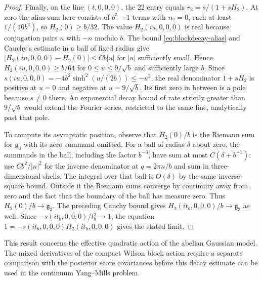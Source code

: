 \begin{proof}
Finally, on the line $(t,0,0,0)$, the $22$ entry equals $r_2=s/(1+sH_2)$.
At zero the alias sum here consists of $b^3-1$ terms with $n_2=0$, each at
least $1/(16b^2)$, so $H_2(0)\ge b/32$. The value $H_2(iu,0,0,0)$ is real
because conjugation pairs $n$ with $-n$ modulo $b$. The bound \eqref{eq:blockdecay-alias}
and Cauchy's estimate in a ball of fixed radius give
$|H_2(iu,0,0,0)-H_2(0)|\le Cb|u|$ for $|u|$ sufficiently small. Hence
$H_2(iu,0,0,0)\ge b/64$ for $0\le u\le9/\sqrt b$ and sufficiently large $b$.
Since $s(iu,0,0,0)=-4b^2\sinh^2(u/(2b))\le-u^2$, the real denominator
$1+sH_2$ is positive at $u=0$ and negative at $u=9/\sqrt b$. Its first
zero in between is a pole because $s\ne0$ there. An exponential decay
bound of rate strictly greater than $9/\sqrt b$ would extend the Fourier
series, restricted to the same line, analytically past that pole.

To compute its asymptotic position, observe that $H_2(0)/b$ is the Riemann
sum for $\mathfrak g_3$ with its zero summand omitted. For a ball of radius
$\delta$ about zero, the summands in the ball, including the factor $b^{-3}$,
have sum at most $C(\delta+b^{-1})$: use $C b^2/|n|^2$ for the inverse
denominator at $q=2\pi n/b$ and sum in three-dimensional shells. The
integral over that ball is $O(\delta)$ by the same inverse-square bound.
Outside it the Riemann sums converge by continuity away from zero and the
fact that the boundary of the ball has measure zero. Thus $H_2(0)/b\to
\mathfrak g_3$. The preceding Cauchy bound gives $H_2(it_b,0,0,0)/b\to
\mathfrak g_3$ as well. Since $-s(it_b,0,0,0)/t_b^2\to1$, the equation
$1=-s(it_b,0,0,0)H_2(it_b,0,0,0)$ gives the stated limit.
\end{proof}

This result concerns the effective quadratic action of the abelian Gaussian
model. The mixed derivatives of the compact Wilson block action require a
separate comparison with the posterior score covariances before this decay
estimate can be used in the continuum Yang--Mills problem.
